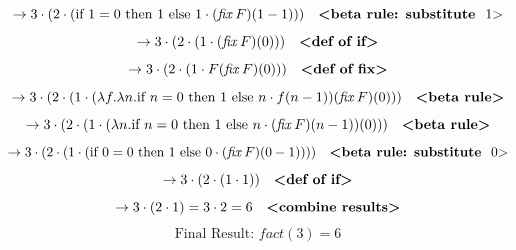 \documentclass{article}
\theoremstyle{plain}
\theoremstyle{definition}
\theoremstyle{remark}
\begin{document}
\[
\to 3 \cdot (2 \cdot (\text{if } 1 = 0 \text{ then } 1 \text{ else } 1 \cdot (\mathit{fix} \, F)(1-1))) \quad \text{\textbf{<beta rule: substitute } 1\text{>}}
\]
\[
\to 3 \cdot (2 \cdot (1 \cdot (\mathit{fix} \, F)(0))) \quad \text{\textbf{<def of if>}}
\]
\[
\to 3 \cdot (2 \cdot (1 \cdot F(\mathit{fix} \, F)(0))) \quad \text{\textbf{<def of fix>}}
\]
\[
\to 3 \cdot (2 \cdot (1 \cdot (\lambda f. \lambda n. \text{if } n = 0 \text{ then } 1 \text{ else } n \cdot f(n-1))(\mathit{fix} \, F)(0))) \quad \text{\textbf{<beta rule>}}
\]
\[
\to 3 \cdot (2 \cdot (1 \cdot (\lambda n. \text{if } n = 0 \text{ then } 1 \text{ else } n \cdot (\mathit{fix} \, F)(n-1))(0))) \quad \text{\textbf{<beta rule>}}
\]
\[
\to 3 \cdot (2 \cdot (1 \cdot (\text{if } 0 = 0 \text{ then } 1 \text{ else } 0 \cdot (\mathit{fix} \, F)(0-1)))) \quad \text{\textbf{<beta rule: substitute } 0\text{>}}
\]
\[
\to 3 \cdot (2 \cdot (1 \cdot 1)) \quad \text{\textbf{<def of if>}}
\]
\[
\to 3 \cdot (2 \cdot 1) = 3 \cdot 2 = 6 \quad \text{\textbf{<combine results>}}
\]
\[
\text{Final Result: } \mathit{fact}(3) = 6
\]
\end{document}

